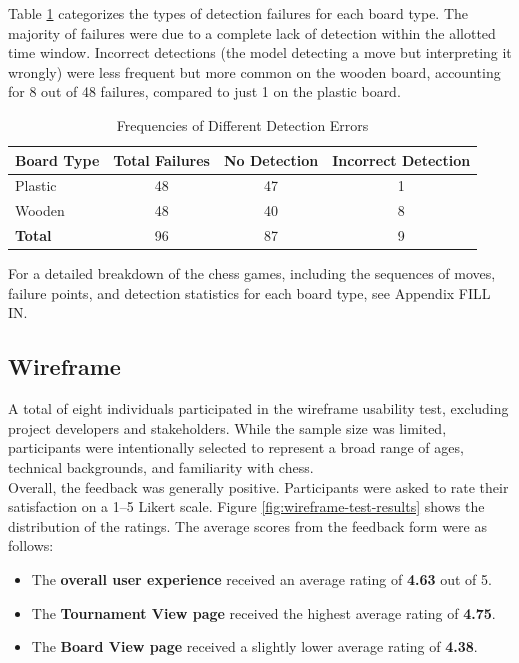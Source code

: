 Table \ref{tab:different-errors} categorizes the types of detection failures for each board type. The majority of failures were due to a complete lack of detection within the allotted time window. Incorrect detections (the model detecting a move but interpreting it wrongly) were less frequent but more common on the wooden board, accounting for 8 out of 48 failures, compared to just 1 on the plastic board.  \\

\begin{table}[htbp]
\centering
\caption[Different detection errors]{Frequencies of Different Detection Errors}
\label{tab:different-errors}
\begin{tabular}{lccc}
\toprule
\textbf{Board Type} & \textbf{Total Failures} & \textbf{No Detection} & \textbf{Incorrect Detection} \\
\midrule
Plastic & 48 & 47 & 1 \\
Wooden & 48 & 40 & 8 \\
\midrule
\textbf{Total} & 96 & 87 & 9 \\
\bottomrule
\end{tabular}
\end{table}

For a detailed breakdown of the chess games, including the sequences of moves, failure points, and detection statistics for each board type, see Appendix FILL IN.

\subsection{Wireframe}
\label{subsec:wireframe-results}

A total of eight individuals participated in the wireframe usability test, excluding project developers and stakeholders. While the sample size was limited, participants were intentionally selected to represent a broad range of ages, technical backgrounds, and familiarity with chess. \\

Overall, the feedback was generally positive. Participants were asked to rate their satisfaction on a 1–5 Likert scale. Figure \ref{fig:wireframe-test-results} shows the distribution of the ratings. The average scores from the feedback form were as follows:

\begin{itemize}
    \item The \textbf{overall user experience} received an average rating of \textbf{4.63} out of 5.
    \item The \textbf{Tournament View page} received the highest average rating of \textbf{4.75}.
    \item The \textbf{Board View page} received a slightly lower average rating of \textbf{4.38}.
\end{itemize}

